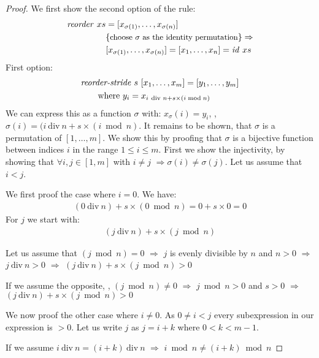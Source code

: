 \begin{proof}
  We first show the second option of the rule:
  \begin{align*}
    \text{\textit{reorder}}\ xs &= [x_{\sigma(1)}, \ldots, x_{\sigma(n)}]\\
                 &\{\text{\small choose $\sigma$ as the identity permutation}\} \Rightarrow\\
                 & [x_{\sigma(1)}, \ldots, x_{\sigma(n)}] = [x_1, \ldots, x_n] = \text{\textit{id}}\ xs
  \end{align*}
  First option:
  \begin{align*}
    &\text{\textit{reorder-stride}}\ s\ [x_1, \ldots, x_m] = [y_1, \ldots, y_m]\\
    &\qquad \text{where}\ y_i = x_{i\ \text{\normalfont div } n + s\times (i \bmod{n})}
  \end{align*}
  We can express this as a function $\sigma$ with: $x_\sigma(i) = y_i$, \ie, $\sigma(i) = (i\ \text{div}\ n + s\times (i \bmod{n})$.
  It remains to be shown, that $\sigma$ is a permutation of $[1, \ldots, m]$.
  We show this by proofing that $\sigma$ is a bijective function between indices $i$ in the range $1\leq i \leq m$.
  First we show the injectivity, by showing that $\forall i, j \in [1, m]$ with $i\neq j$ $\Rightarrow \sigma(i)\neq \sigma(j)$.
  Let us assume that $i< j$.

  We first proof the case where $i = 0$.
  We have:
  \begin{align*}
    (0\ \text{div}\ n) + s\times (0 \bmod{n}) = 0 + s\times 0 = 0
  \end{align*}
  For $j$ we start with:
  \begin{align*}
    (j\ \text{div}\ n) + s\times (j \bmod{n})
  \end{align*}

  Let us assume that $(j \bmod{n}) = 0$ $\Rightarrow$
  $j$ is evenly divisible by $n$ and $n>0$ $\Rightarrow$ $j\ \text{div}\ n > 0$
  $\Rightarrow$ $(j\ \text{div}\ n) + s\times (j\bmod{n}) > 0$

  If we assume the opposite, \ie, $(j \bmod{n}) \neq 0$ $\Rightarrow$
  $j \bmod{n} > 0$ and $s > 0$ $\Rightarrow$ $(j\ \text{div}\ n) + s\times (j\bmod{n}) > 0$


  We now proof the other case where $i\neq 0$.
  As $0\neq i < j$ every subexpression in our expression is $>0$.
  Let us write $j$ as $j=i+k$ where $0<k<m-1$.


  If we assume $i\ \text{div}\ n = (i+k)\ \text{div}\ n$
  $\Rightarrow$ $i\bmod{n} \neq (i+k)\bmod{n}$


\end{proof}
